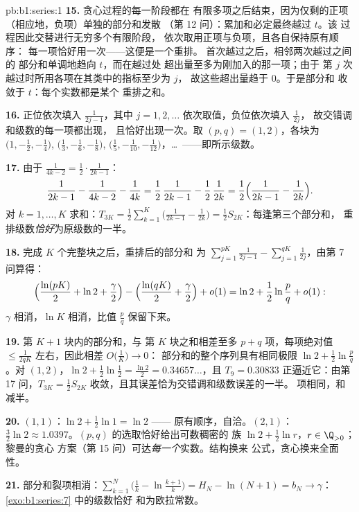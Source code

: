 \begin{solution}{pb:b1:series:1}
\textbf{15.} 贪心过程的每一阶段都在
有限多项之后结束，因为仅剩的正项
（相应地，负项）单独的部分和发散
（第 12 问）：累加和必定最终越过 $t$。该
过程因此交替进行无穷多个有限阶段，
依次取用正项与负项，且各自保持原有顺序：
每一项恰好用一次——这便是一个重排。
首次越过之后，相邻两次越过之间的
部分和单调地趋向 $t$，而在越过处
超出量至多为刚加入的那一项；由于
第 $j$ 次越过时所用各项在其类中的指标至少为 $j$，
故这些超出量趋于 $0$。于是部分和
收敛于 $t$：每个实数都是某个
重排之和。

\textbf{16.} 正位依次填入 $\frac{1}{2j-1}$，其中
$j = 1, 2, \dots$ 依次取值，负位依次填入 $\frac{1}{2j}$，
故交错调和级数的每一项都出现，
且恰好出现一次。取 $(p, q) = (1, 2)$，各块为
$\bigl(1, -\frac12, -\frac14\bigr)$, $\bigl(\frac13, -\frac16,
-\frac18\bigr)$, $\bigl(\frac15, -\frac1{10},
-\frac1{12}\bigr)$，\dots\ ——即所示级数。

\textbf{17.} 由于 $\frac{1}{4k-2} = \frac12\cdot\frac{1}{2k-1}$：
\[
\frac{1}{2k-1} - \frac{1}{4k-2} - \frac{1}{4k}
= \frac12\,\frac{1}{2k-1} - \frac12\,\frac{1}{2k}
= \frac12\Bigl(\frac{1}{2k-1} - \frac{1}{2k}\Bigr).
\]
对 $k = 1, \dots, K$ 求和：$T_{3K} = \frac12
\sum_{k=1}^{K}\bigl(\frac{1}{2k-1} - \frac{1}{2k}\bigr) =
\frac12 S_{2K}$：每逢第三个部分和，
重排级数\emph{恰好}为原级数的一半。

\textbf{18.} 完成 $K$ 个完整块之后，重排后的部分和
为 $\sum_{j=1}^{pK}\frac{1}{2j-1} -
\sum_{j=1}^{qK}\frac{1}{2j}$，由第 7 问算得：
\[
\Bigl(\frac{\ln(pK)}{2} + \ln 2 + \frac\gamma2\Bigr)
- \Bigl(\frac{\ln(qK)}{2} + \frac\gamma2\Bigr) + o(1)
= \ln 2 + \frac12\ln\frac pq + o(1) :
\]
$\gamma$ 相消，$\ln K$ 相消，比值
$\frac pq$ 保留下来。

\textbf{19.} 第 $K + 1$ 块内的部分和，与
第 $K$ 块之和相差至多 $p + q$ 项，每项绝对值
$\leq \frac{1}{2qK}$ 左右，因此相差 $O\bigl(\frac1K\bigr) \to 0$：
部分和的整个序列具有相同极限 $\ln 2 +
\frac12\ln\frac pq$。对 $(1, 2)$，$\ln 2 + \frac12\ln\frac12 =
\frac{\ln 2}{2} = 0.34657\dots$，且 $T_9 = 0.30833$
正逼近它：由第 17 问，$T_{3K} = \frac12 S_{2K}$
收敛，且其误差恰为交错调和级数误差的一半。
项相同，和减半。

\textbf{20.} $(1,1)$：$\ln 2 + \frac12\ln 1 = \ln 2$ ——
原有顺序，自洽。$(2,1)$：$\frac32\ln 2 \approx
1.0397$。$(p,q)$ 的选取恰好给出可数稠密的
族 $\ln 2 + \frac12\ln r$，$r \in \Q_{>0}$；黎曼的贪心
方案（第 15 问）可达\emph{每一个}实数。结构换来
公式，贪心换来全面性。

\textbf{21.} 部分和裂项相消：$\sum_{k=1}^{N}
\bigl(\frac1k - \ln\frac{k+1}{k}\bigr) = H_N - \ln(N+1) = b_N
\to \gamma$：\cref{exo:b1:series:7} 中的级数恰好
和为欧拉常数。


\end{solution}
